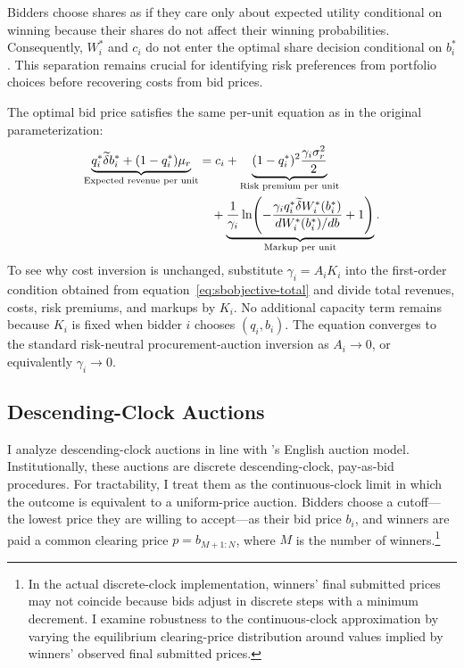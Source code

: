 \documentclass[10pt]{article}
\theoremstyle{plain}
\theoremstyle{definition}
\begin{document}

Bidders choose shares as if they care only about expected utility conditional
on winning because their shares do not affect their winning probabilities.
Consequently, $W_i^\ast$ and $c_i$ do not enter the optimal share decision
conditional on $b_i^\ast$. This separation remains crucial for identifying
risk preferences from portfolio choices before recovering costs from bid
prices.

The optimal bid price satisfies the same per-unit equation as in the original
parameterization:
\begin{align}
\label{eq:optbsb}
\underbrace{q_i^\ast\widetilde{\delta}b_i^\ast
+(1-q_i^\ast)\mu_r}_{\text{Expected revenue per unit}}
&=c_i
+\underbrace{(1-q_i^\ast)^2
\frac{\gamma_i\sigma_r^2}{2}}_{\text{Risk premium per unit}} \notag\\
&\quad+
\underbrace{
\frac{1}{\gamma_i}
\ln\!\left(
-\frac{\gamma_iq_i^\ast\widetilde{\delta}W_i^\ast(b_i^\ast)}
{dW_i^\ast(b_i^\ast)/db}+1
\right)
}_{\text{Markup per unit}}.
\end{align}
To see why cost inversion is unchanged, substitute
$\gamma_i=A_iK_i$ into the first-order condition obtained from
equation~\eqref{eq:sbobjective-total} and divide total revenues, costs, risk
premiums, and markups by $K_i$. No additional capacity term remains because
$K_i$ is fixed when bidder $i$ chooses $(q_i,b_i)$. The equation converges to
the standard risk-neutral procurement-auction inversion as $A_i\to0$, or
equivalently $\gamma_i\to0$.

\subsection{Descending-Clock Auctions}
\label{sec:dc}

I analyze descending-clock auctions in line with \citet{Milgrom1982}'s English
auction model. Institutionally, these auctions are discrete descending-clock,
pay-as-bid procedures. For tractability, I treat them as the continuous-clock
limit in which the outcome is equivalent to a uniform-price auction. Bidders
choose a cutoff---the lowest price they are willing to accept---as their bid
price $b_i$, and winners are paid a common clearing price
$p=b_{M+1:N}$, where $M$ is the number of winners.\footnote{
In the actual discrete-clock implementation, winners' final submitted prices
may not coincide because bids adjust in discrete steps with a minimum
decrement. I examine robustness to the continuous-clock approximation by
varying the equilibrium clearing-price distribution around values implied by
winners' observed final submitted prices.
}
\end{document}
